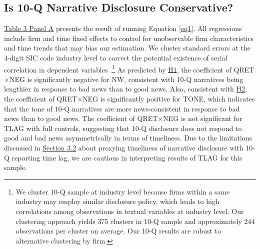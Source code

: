\documentclass[letterpaper,12pt]{article}
\begin{document}
\begin{spacing}{1.5}
\subsection{Is 10-Q Narrative Disclosure Conservative?}
\noindent \hyperref[T3PA]{Table 3 Panel A} presents the result of running Equation \eqref{eq1}. All regressions include firm and time fixed effects to control for unobservable firm characteristics and time trends that may bias our estimation. We cluster standard errors at the 4-digit SIC code industry level to correct the potential existence of serial correlation in dependent variables \cite{petersenEstimatingStandardErrors2009}.\footnote{We cluster 10-Q sample at industry level because firms within a same industry may employ similar disclosure policy, which leads to high correlations among observations in textual variables at industry level. Our clustering approach yields 375 clusters in 10-Q sample and approximately 244 observations per cluster on average. Our 10-Q results are robust to alternative clustering by firm. } As predicted by \hyperref[h1]{H1}, the coefficient of QRET$\times$NEG is significantly negative for NW, consistent with 10-Q narratives being lengthier in response to bad news than to good news. Also, consistent with \hyperref[h2]{H2}, the coefficient of QRET$\times$NEG is significantly positive for TONE, which indicates that the tone of 10-Q narratives are more news-consistent in response to bad news than to good news. The coefficient of QRET$\times$NEG is not significant for TLAG with full controls, suggesting that 10-Q disclosure does not respond to good and bad news asymmetrically in terms of timeliness. Due to the limitations discussed in \hyperref[sec3.2]{Section 3.2} about proxying timeliness of narrative disclosure with 10-Q reporting time lag, we are cautious in interpreting results of TLAG for this sample.


\end{spacing}
\end{document}

